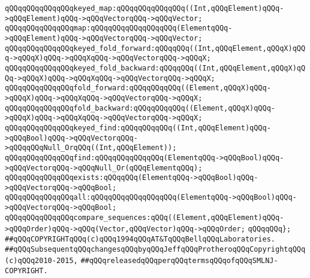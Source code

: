 \newline
\verb|qQQqqQQqqQQqqQQqkeyed_map:qQQqqQQqqQQqqQQq((Int,qQQqElement)qQQq->qQQqElement)qQQq->qQQqVectorqQQq->qQQqVector;|\newline
\verb|qQQqqQQqqQQqqQQqmap:qQQqqQQqqQQqqQQqqQQq(ElementqQQq->qQQqElement)qQQq->qQQqVectorqQQq->qQQqVector;|\newline
\newline
\verb|qQQqqQQqqQQqqQQqkeyed_fold_forward:qQQqqQQq((Int,qQQqElement,qQQqX)qQQq->qQQqX)qQQq->qQQqXqQQq->qQQqVectorqQQq->qQQqX;|\newline
\verb|qQQqqQQqqQQqqQQqkeyed_fold_backward:qQQqqQQq((Int,qQQqElement,qQQqX)qQQq->qQQqX)qQQq->qQQqXqQQq->qQQqVectorqQQq->qQQqX;|\newline
\newline
\verb|qQQqqQQqqQQqqQQqfold_forward:qQQqqQQqqQQq((Element,qQQqX)qQQq->qQQqX)qQQq->qQQqXqQQq->qQQqVectorqQQq->qQQqX;|\newline
\verb|qQQqqQQqqQQqqQQqfold_backward:qQQqqQQqqQQq((Element,qQQqX)qQQq->qQQqX)qQQq->qQQqXqQQq->qQQqVectorqQQq->qQQqX;|\newline
\newline
\verb|qQQqqQQqqQQqqQQqkeyed_find:qQQqqQQqqQQq((Int,qQQqElement)qQQq->qQQqBool)qQQq->qQQqVectorqQQq->qQQqqQQqNull_OrqQQq((Int,qQQqElement));|\newline
\verb|qQQqqQQqqQQqqQQqfind:qQQqqQQqqQQqqQQq(ElementqQQq->qQQqBool)qQQq->qQQqVectorqQQq->qQQqNull_Or(qQQqElementqQQq);|\newline
\newline
\verb|qQQqqQQqqQQqqQQqexists:qQQqqQQq(ElementqQQq->qQQqBool)qQQq->qQQqVectorqQQq->qQQqBool;|\newline
\verb|qQQqqQQqqQQqqQQqall:qQQqqQQqqQQqqQQqqQQq(ElementqQQq->qQQqBool)qQQq->qQQqVectorqQQq->qQQqBool;|\newline
\newline
\verb|qQQqqQQqqQQqqQQqcompare_sequences:qQQq((Element,qQQqElement)qQQq->qQQqOrder)qQQq->qQQq(Vector,qQQqVector)qQQq->qQQqOrder;|\newline
\newline
\verb|qQQqqQQq};|\newline
\newline
\newline
\verb|##qQQqCOPYRIGHTqQQq(c)qQQq1994qQQqAT&TqQQqBellqQQqLaboratories.|\newline
\verb|##qQQqSubsequentqQQqchangesqQQqbyqQQqJeffqQQqProtheroqQQqCopyrightqQQq(c)qQQq2010-2015,|\newline
\verb|##qQQqreleasedqQQqperqQQqtermsqQQqofqQQqSMLNJ-COPYRIGHT.|\newline

